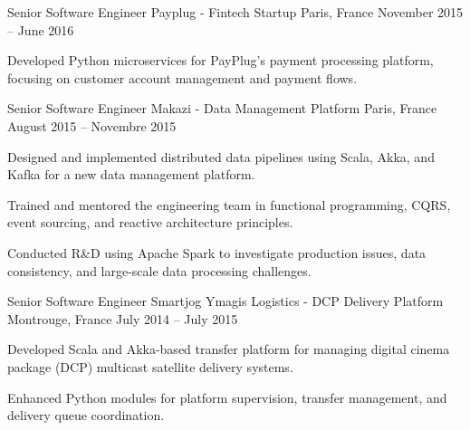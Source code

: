 \begin{cventries}
  \cventry
    {Senior Software Engineer} %
    {Payplug - Fintech Startup} %
    {Paris, France} %
    {November 2015 – June 2016} %
    {
      \begin{cvitems} %
        \item {Developed Python microservices for PayPlug's payment processing platform, focusing on customer account management and payment flows.}
      \end{cvitems}
    }

  \cventry
    {Senior Software Engineer} %
    {Makazi - Data Management Platform} %
    {Paris, France} %
    {August 2015 – Novembre 2015} %
    {
      \begin{cvitems} %
        \item {Designed and implemented distributed data pipelines using Scala, Akka, and Kafka for a new data management platform.}
        \item {Trained and mentored the engineering team in functional programming, CQRS, event sourcing, and reactive architecture principles.}
        \item {Conducted R\&D using Apache Spark to investigate production issues, data consistency, and large-scale data processing challenges.}
      \end{cvitems}
    }

  \cventry
    {Senior Software Engineer} %
    {Smartjog Ymagis Logistics - DCP Delivery Platform} %
    {Montrouge, France} %
    {July 2014 – July 2015} %
    {
      \begin{cvitems} %
        \item {Developed Scala and Akka-based transfer platform for managing digital cinema package (DCP) multicast satellite delivery systems.}
        \item {Enhanced Python modules for platform supervision, transfer management, and delivery queue coordination.}
      \end{cvitems}
    }


\end{cventries}
